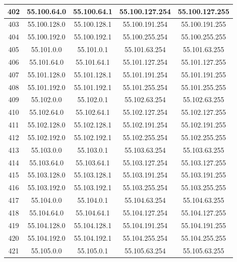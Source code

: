 \documentclass[letterpaper,12pt]{article}
\begin{document}
\begin{center}
\begin{longtable}{|c|c|c|c|c|}
                402 & 55.100.64.0 & 55.100.64.1 & 55.100.127.254 & 55.100.127.255 \\ \hline
                403 & 55.100.128.0 & 55.100.128.1 & 55.100.191.254 & 55.100.191.255 \\ \hline
                404 & 55.100.192.0 & 55.100.192.1 & 55.100.255.254 & 55.100.255.255 \\ \hline
                405 & 55.101.0.0 & 55.101.0.1 & 55.101.63.254 & 55.101.63.255 \\ \hline
                406 & 55.101.64.0 & 55.101.64.1 & 55.101.127.254 & 55.101.127.255 \\ \hline
                407 & 55.101.128.0 & 55.101.128.1 & 55.101.191.254 & 55.101.191.255 \\ \hline
                408 & 55.101.192.0 & 55.101.192.1 & 55.101.255.254 & 55.101.255.255 \\ \hline
                409 & 55.102.0.0 & 55.102.0.1 & 55.102.63.254 & 55.102.63.255 \\ \hline
                410 & 55.102.64.0 & 55.102.64.1 & 55.102.127.254 & 55.102.127.255 \\ \hline
                411 & 55.102.128.0 & 55.102.128.1 & 55.102.191.254 & 55.102.191.255 \\ \hline
                412 & 55.102.192.0 & 55.102.192.1 & 55.102.255.254 & 55.102.255.255 \\ \hline
                413 & 55.103.0.0 & 55.103.0.1 & 55.103.63.254 & 55.103.63.255 \\ \hline
                414 & 55.103.64.0 & 55.103.64.1 & 55.103.127.254 & 55.103.127.255 \\ \hline
                415 & 55.103.128.0 & 55.103.128.1 & 55.103.191.254 & 55.103.191.255 \\ \hline
                416 & 55.103.192.0 & 55.103.192.1 & 55.103.255.254 & 55.103.255.255 \\ \hline
                417 & 55.104.0.0 & 55.104.0.1 & 55.104.63.254 & 55.104.63.255 \\ \hline
                418 & 55.104.64.0 & 55.104.64.1 & 55.104.127.254 & 55.104.127.255 \\ \hline
                419 & 55.104.128.0 & 55.104.128.1 & 55.104.191.254 & 55.104.191.255 \\ \hline
                420 & 55.104.192.0 & 55.104.192.1 & 55.104.255.254 & 55.104.255.255 \\ \hline
                421 & 55.105.0.0 & 55.105.0.1 & 55.105.63.254 & 55.105.63.255 \\ \hline

\end{longtable}
\end{center}
\end{document}
